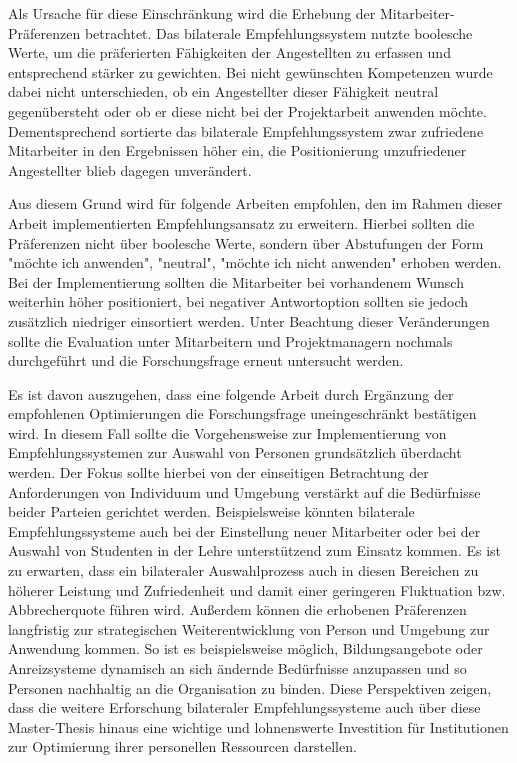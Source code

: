 Als Ursache für diese Einschränkung wird die Erhebung der Mitarbeiter-Präferenzen betrachtet. Das bilaterale Empfehlungssystem nutzte boolesche Werte, um die präferierten Fähigkeiten der Angestellten zu erfassen und entsprechend stärker zu gewichten. Bei nicht gewünschten Kompetenzen wurde dabei nicht unterschieden, ob ein Angestellter dieser Fähigkeit neutral gegenübersteht oder ob er diese nicht bei der Projektarbeit anwenden möchte. Dementsprechend sortierte das bilaterale Empfehlungssystem zwar zufriedene Mitarbeiter in den Ergebnissen höher ein, die Positionierung unzufriedener Angestellter blieb dagegen unverändert.

Aus diesem Grund wird für folgende Arbeiten empfohlen, den im Rahmen dieser Arbeit implementierten Empfehlungsansatz zu erweitern. Hierbei sollten die Präferenzen nicht über boolesche Werte, sondern über Abstufungen der Form "möchte ich anwenden", "neutral", "möchte ich nicht anwenden" erhoben werden. Bei der Implementierung sollten die Mitarbeiter bei vorhandenem Wunsch weiterhin höher positioniert, bei negativer Antwortoption sollten sie jedoch zusätzlich niedriger einsortiert werden. Unter Beachtung dieser Veränderungen sollte die Evaluation unter Mitarbeitern und Projektmanagern nochmals durchgeführt und die Forschungsfrage erneut untersucht werden.

Es ist davon auszugehen, dass eine folgende Arbeit durch Ergänzung der empfohlenen Optimierungen die Forschungsfrage uneingeschränkt bestätigen wird. In diesem Fall sollte die Vorgehensweise zur Implementierung von Empfehlungssystemen zur Auswahl von Personen grundsätzlich überdacht werden. Der Fokus sollte hierbei von der einseitigen Betrachtung der Anforderungen von Individuum und Umgebung verstärkt auf die Bedürfnisse beider Parteien gerichtet werden. Beispielsweise könnten bilaterale Empfehlungssysteme auch bei der Einstellung neuer Mitarbeiter oder bei der Auswahl von Studenten in der Lehre unterstützend zum Einsatz kommen. Es ist zu erwarten, dass ein bilateraler Auswahlprozess auch in diesen Bereichen zu höherer Leistung und Zufriedenheit und damit einer geringeren Fluktuation bzw. Abbrecherquote führen wird. Außerdem können die erhobenen Präferenzen langfristig zur strategischen Weiterentwicklung von Person und Umgebung zur Anwendung kommen. So ist es beispielsweise möglich, Bildungsangebote oder Anreizsysteme dynamisch an sich ändernde Bedürfnisse anzupassen und so Personen nachhaltig an die Organisation zu binden. Diese Perspektiven zeigen, dass die weitere Erforschung bilateraler Empfehlungssysteme auch über diese Master-Thesis hinaus eine wichtige und lohnenswerte Investition für Institutionen zur Optimierung ihrer personellen Ressourcen darstellen.

